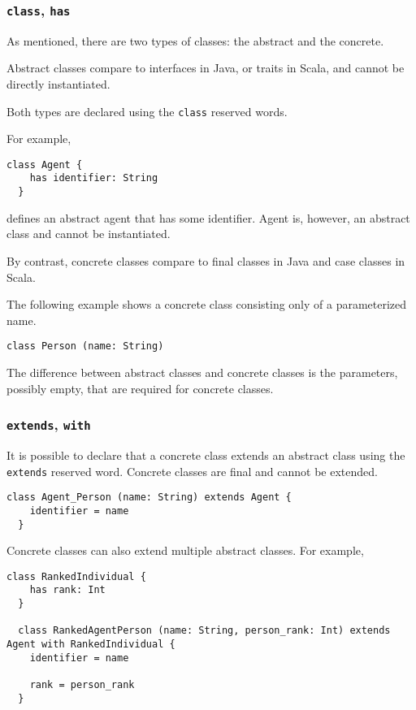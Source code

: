 \documentclass[12pt,a4paper]{book}
\newcommand{\srccode}[1]{\texttt{{#1}}}
\newcommand{\reservedWord}[1]{{\color{blue}\srccode{#1}}\xspace}
\newcommand{\sclass}{\reservedWord{class}}
\newcommand{\shas}{\reservedWord{has}}
\newcommand{\sextends}{\reservedWord{extends}}
\newcommand{\swith}{\reservedWord{with}}
\begin{document}
    \subsubsection{\sclass, \shas}

    As mentioned, there are two types of classes: the abstract and the concrete.

    Abstract classes compare to interfaces in Java, or traits in Scala, and cannot be directly instantiated.

    Both types are declared using the \sclass reserved words.

    For example,
    \begin{lstlisting}[label={lst:exampleAbstractClass}]
  class Agent {
    has identifier: String
  }
    \end{lstlisting}
    defines an abstract agent that has some identifier.
    Agent is, however, an abstract class and cannot be instantiated.

    By contrast, concrete classes compare to final classes in Java and case classes in Scala.

    The following example shows a concrete class consisting only of a parameterized name.
    \begin{lstlisting}[label={lst:exampleConcreteClass}]
  class Person (name: String)
    \end{lstlisting}

    The difference between abstract classes and concrete classes is the parameters, possibly empty, that are required for concrete classes.

    \subsubsection{\sextends, \swith}

    It is possible to declare that a concrete class extends an abstract class using the \sextends reserved word.
    Concrete classes are final and cannot be extended.

    \begin{lstlisting}[label={lst:exampleExtends}]
  class Agent_Person (name: String) extends Agent {
    identifier = name
  }
    \end{lstlisting}

    Concrete classes can also extend multiple abstract classes.
    For example,
    \begin{lstlisting}[label={lst:exampleWith}]
  class RankedIndividual {
    has rank: Int
  }

  class RankedAgentPerson (name: String, person_rank: Int) extends Agent with RankedIndividual {
    identifier = name

    rank = person_rank
  }
    \end{lstlisting}
\end{document}

